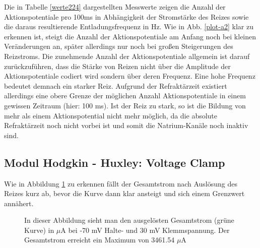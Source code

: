 \documentclass[11pt]{article}
\begin{document}
Die in Tabelle \ref{werte224} dargestellten Messwerte zeigen die Anzahl der Aktionspotentiale pro 100ms in Abhängigkeit der Stromstärke des Reizes sowie die daraus resultierende Entladungsfrequenz in Hz. Wie in Abb. \ref{plot-a2} klar zu erkennen ist, steigt die Anzahl der Aktionspotentiale am Anfang noch bei kleinen Veränderungen an, später allerdings nur noch bei großen Steigerungen des Reizstroms. Die zunehmende Anzahl der Aktionspotentiale allgemein ist darauf zurückzuführen, dass die Stärke von Reizen nicht über die Amplitude der Aktionspotentiale codiert wird sondern über deren Frequenz. Eine hohe Frequenz bedeutet demnach ein starker Reiz. Aufgrund der Refraktärzeit existiert allerdings eine obere Grenze der möglichen Anzahl Aktionspotentiale in einem gewissen Zeitraum (hier: 100 ms).  Ist der Reiz zu stark, so ist die Bildung von mehr als einem Aktionspotential nicht mehr möglich, da die absolute Refraktärzeit noch nicht vorbei ist und somit die Natrium-Kanäle noch inaktiv sind.

\subsection{Modul Hodgkin - Huxley: Voltage Clamp}

Wie in Abbildung \ref{graph32} zu erkennen fällt der Gesamtstrom nach Auslösung des Reizes kurz ab, bevor die Kurve dann klar  ansteigt und sich einem Grenzwert annähert. 

\begin{figure}[H]
\caption{In dieser Abbildung sieht man den ausgelösten Gesamtstrom (grüne Kurve) in $\mu$A bei -70 mV Halte- und 30 mV Klemmspannung. Der Gesamtstrom erreicht ein Maximum von 3461.54 $\mu$A}
\label{graph32}
\end{figure}
\end{document}
